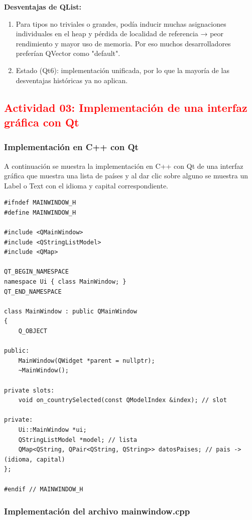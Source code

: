 \textbf{Desventajas de QList:}

\begin{enumerate}
    \item Para tipos no triviales o grandes, podía inducir muchas asignaciones individuales en el heap y pérdida de localidad de referencia → peor rendimiento y mayor uso de memoria. Por eso muchos desarrolladores preferían QVector como "default". 
    \item Estado (Qt6): implementación unificada, por lo que la mayoría de las desventajas históricas ya no aplican.
\end{enumerate}




\subsection{\textcolor{red}{Actividad 03: Implementación de una interfaz gráfica con Qt}}

\subsubsection {Implementación en C++ con Qt}

A continuación se muestra la implementación en C++ con Qt de una interfaz gráfica que muestra una lista de países y al dar clic sobre alguno se muestra un Label o Text con el idioma y capital correspondiente.

\begin{lstlisting}[style=cpp-style, caption={mainwindow.h}]
#ifndef MAINWINDOW_H
#define MAINWINDOW_H

#include <QMainWindow>
#include <QStringListModel>
#include <QMap>

QT_BEGIN_NAMESPACE
namespace Ui { class MainWindow; }
QT_END_NAMESPACE

class MainWindow : public QMainWindow
{
    Q_OBJECT

public:
    MainWindow(QWidget *parent = nullptr);
    ~MainWindow();

private slots:
    void on_countrySelected(const QModelIndex &index); // slot

private:
    Ui::MainWindow *ui;
    QStringListModel *model; // lista
    QMap<QString, QPair<QString, QString>> datosPaises; // pais -> (idioma, capital)
};

#endif // MAINWINDOW_H
\end{lstlisting}

\subsubsection {Implementación del archivo mainwindow.cpp}

